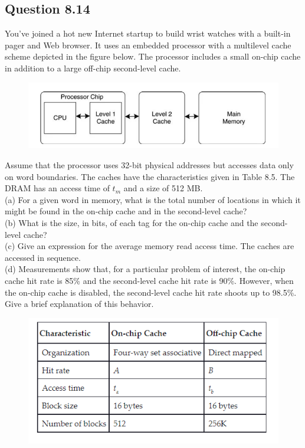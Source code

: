 \documentclass[12pt, letter]{article}
\begin{document}
	\subsection{Question 8.14}
	\begin{tcolorbox}[colback = bg, boxrule = 0pt]
		You've joined a hot new Internet startup to build wrist watches with a built-in pager and Web browser. It uses an embedded processor with a multilevel cache scheme depicted in the figure below. The processor includes a small on-chip cache in addition to a large off-chip second-level cache.
	\end{tcolorbox}
	\begin{figure}[h]
		\centering
		\includegraphics[scale = 1]{System8.14}
		\label{fig:System8.14}
	\end{figure}
	\begin{tcolorbox}[colback = bg, boxrule = 0pt]
		Assume that the processor uses 32-bit physical addresses but accesses data only on word boundaries. The caches have the characteristics given in Table 8.5. The DRAM has an access time of $t_m$ and a size of 512 MB.\\
		
		(a) For a given word in memory, what is the total number of locations in which it might be found in the on-chip cache and in the second-level cache?\\
		(b) What is the size, in bits, of each tag for the on-chip cache and the second-level cache?\\
		(c) Give an expression for the average memory read access time. The caches are accessed in sequence.\\
		(d) Measurements show that, for a particular problem of interest, the on-chip cache hit rate is 85\% and the second-level cache hit rate is 90\%. However, when the on-chip cache is disabled, the second-level cache hit rate shoots up to 98.5\%. Give a brief explanation of this behavior.
	\end{tcolorbox}
	
	\begin{figure}[h]
		\centering
		\includegraphics[scale = 1]{Table8.14}
		\label{fig:Table8.14}
	\end{figure}
	
\end{document}
